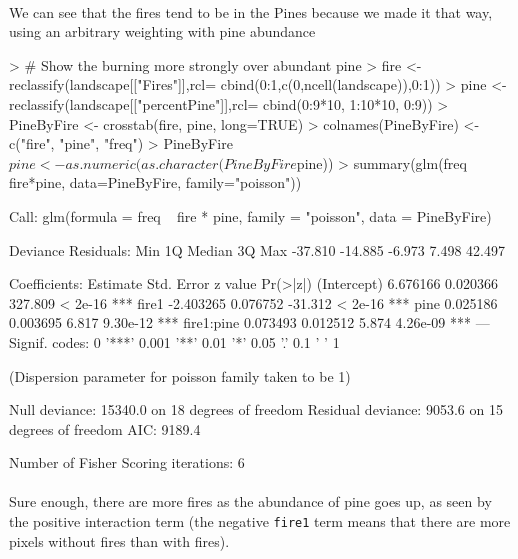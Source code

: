 \documentclass{article}
\begin{document}
\paragraph{}
We can see that the fires tend to be in the Pines because we made it that way, using an arbitrary weighting with pine abundance

\begin{Schunk}
\begin{Sinput}
> # Show the burning more strongly over abundant pine
> fire <- reclassify(landscape[["Fires"]],rcl= cbind(0:1,c(0,ncell(landscape)),0:1))
> pine <- reclassify(landscape[["percentPine"]],rcl= cbind(0:9*10, 1:10*10, 0:9))
> PineByFire <- crosstab(fire, pine, long=TRUE)
> colnames(PineByFire) <- c("fire", "pine", "freq")
> PineByFire$pine <- as.numeric(as.character(PineByFire$pine))
> summary(glm(freq ~ fire*pine, data=PineByFire, family="poisson"))
\end{Sinput}
\begin{Soutput}
Call:
glm(formula = freq ~ fire * pine, family = "poisson", data = PineByFire)

Deviance Residuals:
    Min       1Q   Median       3Q      Max
-37.810  -14.885   -6.973    7.498   42.497

Coefficients:
             Estimate Std. Error z value Pr(>|z|)
(Intercept)  6.676166   0.020366 327.809  < 2e-16 ***
fire1       -2.403265   0.076752 -31.312  < 2e-16 ***
pine         0.025186   0.003695   6.817 9.30e-12 ***
fire1:pine   0.073493   0.012512   5.874 4.26e-09 ***
---
Signif. codes:  0 '***' 0.001 '**' 0.01 '*' 0.05 '.' 0.1 ' ' 1

(Dispersion parameter for poisson family taken to be 1)

    Null deviance: 15340.0  on 18  degrees of freedom
Residual deviance:  9053.6  on 15  degrees of freedom
AIC: 9189.4

Number of Fisher Scoring iterations: 6
\end{Soutput}
\end{Schunk}

\paragraph{}
Sure enough, there are more fires as the abundance of pine goes up, as seen by the positive interaction term (the negative \texttt{fire1} term means that there are more pixels without fires than with fires).
\end{document}
